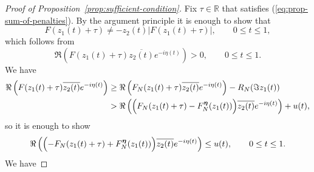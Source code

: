 \documentclass[10pt,a4paper]{amsart}
\begin{document}
\begin{proof}[Proof of Proposition~\ref{prop:sufficient-condition}]
Fix $\tau\in\mathbb{R}$ that satisfies (\ref{eq:prop-sum-of-penalties}).
By the argument principle it is enough to show that 
\[
F(z_{1}(t)+\tau)\neq-z_{2}(t)\left|F(z_{1}(t)+\tau)\right|,\qquad0\leq t\leq1,
\]
which follows from
\[
\Re\left(F(z_{1}(t)+\tau)\overline{z_{2}(t)}e^{-i\eta(t)}\right)>0,\qquad0\leq t\leq1.
\]
We have
\begin{align*}
\Re\left(F(z_{1}(t)+\tau)\overline{z_{2}(t)}e^{-i\eta(t)}\right) & \geq\Re\left(F_{N}(z_{1}(t)+\tau)\overline{z_{2}(t)}e^{-i\eta(t)}\right)-R_{N}(\Im z_{1}(t))\\
 & >\Re\left(\Bigl(F_{N}(z_{1}(t)+\tau)-F_{N}^{\boldsymbol{\eta}}(z_{1}(t))\Bigr)\overline{z_{2}(t)}e^{-i\eta(t)}\right)+u(t),
\end{align*}
so it is enough to show
\begin{equation}
\Re\left(\Bigl(-F_{N}(z_{1}(t)+\tau)+F_{N}^{\boldsymbol{\eta}}(z_{1}(t))\Bigr)\overline{z_{2}(t)}e^{-i\eta(t)}\right)\leq u(t),\qquad0\leq t\leq1.\label{eq:sufficient-condition-u(t)}
\end{equation}
We have


\end{proof}
\end{document}
